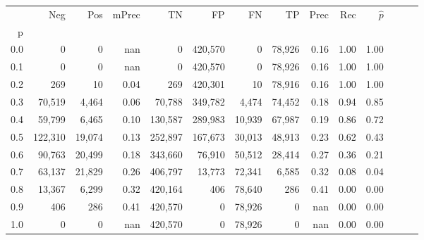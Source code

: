 \begin{tabular}{rrrrrrrrrrrrrr}
\toprule
{} &      Neg &     Pos & mPrec &       TN &       FP &      FN &      TP &  Prec &   Rec & $\hat{p}$ \\
p   &          &         &       &          &          &         &         &       &       &           \\
\midrule
0.0 &        0 &       0 &   nan &        0 &  420,570 &       0 &  78,926 &  0.16 &  1.00 &      1.00 \\
0.1 &        0 &       0 &   nan &        0 &  420,570 &       0 &  78,926 &  0.16 &  1.00 &      1.00 \\
0.2 &      269 &      10 &  0.04 &      269 &  420,301 &      10 &  78,916 &  0.16 &  1.00 &      1.00 \\
0.3 &   70,519 &   4,464 &  0.06 &   70,788 &  349,782 &   4,474 &  74,452 &  0.18 &  0.94 &      0.85 \\
0.4 &   59,799 &   6,465 &  0.10 &  130,587 &  289,983 &  10,939 &  67,987 &  0.19 &  0.86 &      0.72 \\
0.5 &  122,310 &  19,074 &  0.13 &  252,897 &  167,673 &  30,013 &  48,913 &  0.23 &  0.62 &      0.43 \\
0.6 &   90,763 &  20,499 &  0.18 &  343,660 &   76,910 &  50,512 &  28,414 &  0.27 &  0.36 &      0.21 \\
0.7 &   63,137 &  21,829 &  0.26 &  406,797 &   13,773 &  72,341 &   6,585 &  0.32 &  0.08 &      0.04 \\
0.8 &   13,367 &   6,299 &  0.32 &  420,164 &      406 &  78,640 &     286 &  0.41 &  0.00 &      0.00 \\
0.9 &      406 &     286 &  0.41 &  420,570 &        0 &  78,926 &       0 &   nan &  0.00 &      0.00 \\
1.0 &        0 &       0 &   nan &  420,570 &        0 &  78,926 &       0 &   nan &  0.00 &      0.00 \\
\bottomrule
\end{tabular}
